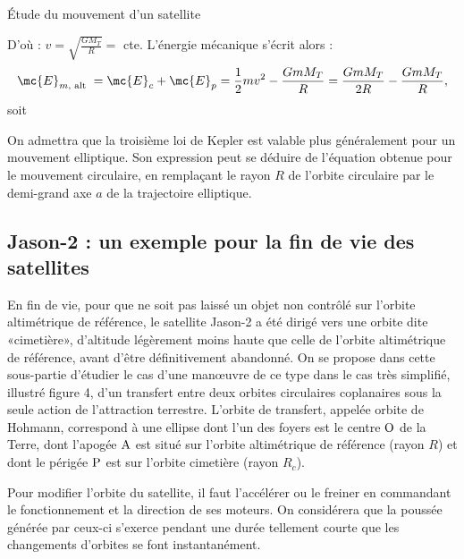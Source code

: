 \begin{exo}[PC][1][devoir]{Étude du mouvement d'un satellite}
\begin{quest}
{D'où : $v=\sqrt{\frac{G M_{T}}{R}}=$ cte.
L'énergie mécanique s'écrit alors : $$\mc{E}_{m, \text { alt }}=\mc{E}_{c}+\mc{E}_{p}=\frac{1}{2} m v^{2}-\frac{G m M_{T}}{R}=\frac{G m M_{T}}{2 R}-\frac{G m M_{T}}{R},$$
soit 
}


\end{quest}
On admettra que la troisième loi de Kepler est valable plus généralement pour un mouvement elliptique. Son expression peut se déduire de l'équation obtenue pour le mouvement circulaire, en remplaçant le rayon $R$ de l'orbite circulaire par le demi-grand axe $a$ de la trajectoire elliptique.

\subsection{Jason-2 : un exemple pour la fin de vie des satellites}
En fin de vie, pour que ne soit pas laissé un objet non contrôlé sur l'orbite altimétrique de référence, le satellite Jason-2 a été dirigé vers une orbite dite «cimetière», d'altitude légèrement moins haute que celle de l'orbite altimétrique de référence, avant d'être définitivement abandonné. On se propose dans cette sous-partie d'étudier le cas d'une manœuvre de ce type dans le cas très simplifié, illustré figure 4, d'un transfert entre deux orbites circulaires coplanaires sous la seule action de l'attraction terrestre. L'orbite de transfert, appelée orbite de Hohmann, correspond à une ellipse dont l'un des foyers est le centre $\rm O$ de la Terre, dont l'apogée $\rm A$ est situé sur l'orbite altimétrique de référence (rayon $R$) et dont le périgée $\rm P$ est sur l'orbite cimetière (rayon $R_{c}$).

Pour modifier l'orbite du satellite, il faut l'accélérer ou le freiner en commandant le fonctionnement et la direction de ses moteurs. On considérera que la poussée générée par ceux-ci s'exerce pendant une durée tellement courte que les changements d'orbites se font instantanément.


\end{exo}
